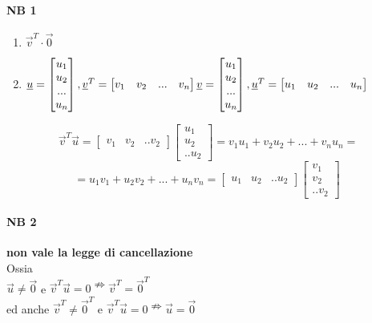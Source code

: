 \paragraph{NB 1}  
\begin{enumerate}
    \item $\vec{v}^T\cdot \vec{0}$
    \item $\vec{u}=
        \begin{bmatrix}
            u_1\\u_2\\... \\u_n
        \end{bmatrix},
        \vec{v}^T=
        \begin{bmatrix}
            v_1 & v_2 & ...& v_n
        \end{bmatrix}\\
        \vec{v}=
        \begin{bmatrix}
            u_1\\u_2\\... \\u_n
        \end{bmatrix},
        \vec{u}^T=
        \begin{bmatrix}
            u_1 & u_2 & ...& u_n
        \end{bmatrix}
        $
\end{enumerate}
{\color{blue}
$$ 
    \vec{v}^T\vec{u}=
    \begin{bmatrix}
        v_1 & v_2 & .. v_2
    \end{bmatrix}
    \begin{bmatrix}
        u_1 \\ u_2 \\ .. u_2
    \end{bmatrix}=
    v_1u_1+v_2u_2+...+v_nu_n=$$
$$
    =u_1v_1+u_2v_2+...+u_nv_n=
    \begin{bmatrix}
        u_1 & u_2 & .. u_2
    \end{bmatrix}
    \begin{bmatrix}
        v_1 \\ v_2 \\ .. v_2
    \end{bmatrix}
    \
$$
}
\paragraph{NB 2} \textbf{non vale la legge di cancellazione}\\
Ossia\\
$\vec{u}\neq\vec{0}$ e $\vec{v}^T\vec{u}=0\nRightarrow\vec{v}^T=\vec{0}^T$\\
ed anche $\vec{v}^T\neq\vec{0}^T$ e $\vec{v}^T\vec{u}=0\nRightarrow\vec{u}=\vec{0}$

